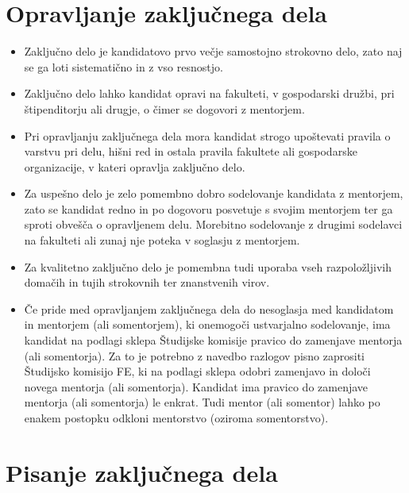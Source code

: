 \documentclass[a4paper,twoside,openright,12pt,slovene]{book}
\begin{document}
\chapter{Opravljanje zaključnega dela} \label{opravljanje_naloge}

\begin{itemize}

\item Zaključno delo je kandidatovo prvo večje samostojno strokovno delo, zato naj se ga loti sistematično in z vso resnostjo.

\item Zaključno delo lahko kandidat opravi na fakulteti, v gospodarski družbi, pri štipenditorju ali drugje, o čimer se dogovori z mentorjem.

\item Pri opravljanju zaključnega dela mora kandidat strogo upoštevati pravila o varstvu pri delu, hišni red in ostala pravila fakultete ali gospodarske organizacije, v kateri opravlja zaključno delo.

\item Za uspešno delo je zelo pomembno dobro sodelovanje kandidata z mentorjem, zato se kandidat redno in po dogovoru posvetuje s svojim mentorjem ter ga sproti obvešča o opravljenem delu. Morebitno sodelovanje z drugimi sodelavci na fakulteti ali zunaj nje poteka v soglasju z mentorjem.

\item Za kvalitetno zaključno delo je pomembna tudi uporaba vseh razpoložljivih domačih in tujih strokovnih ter znanstvenih virov.

\item Če pride med opravljanjem zaključnega dela do nesoglasja med kandidatom in mentorjem (ali somentorjem), ki onemogoči ustvarjalno sodelovanje, ima kandidat na podlagi sklepa Študijske komisije pravico do zamenjave mentorja (ali somentorja). Za to je potrebno z navedbo razlogov pisno zaprositi Študijsko komisijo FE, ki na podlagi sklepa odobri zamenjavo in določi novega mentorja (ali somentorja). Kandidat ima pravico do zamenjave mentorja (ali somentorja) le enkrat. Tudi mentor (ali somentor) lahko po enakem postopku odkloni mentorstvo (oziroma somentorstvo).

\end{itemize}

\chapter{Pisanje zaključnega dela} \label{pisanje_dela}
\end{document}
